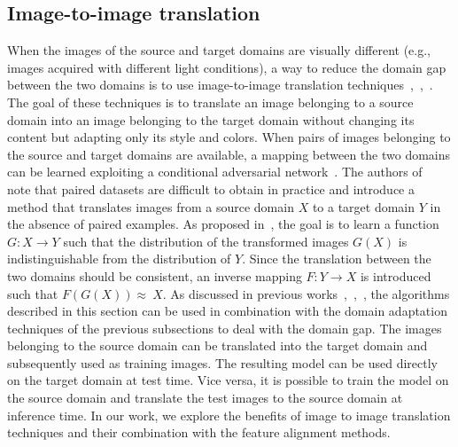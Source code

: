 \documentclass[preprint]{elsarticle}
\begin{document}
\subsection{Image-to-image translation}
When the images of the source and target domains are visually different (e.g., images acquired with different light conditions), a way to reduce the domain gap between the two domains is to use image-to-image translation techniques~\cite{Anoosheh_2019},~\cite{Murez_2018},~\cite{gonzalezgarcia2018imagetoimage}. The goal of these techniques is to translate an image belonging to a source domain into an image belonging to the target domain without changing its content but adapting only its style and colors. When pairs of images belonging to the source and target domains are available, a mapping between the two domains can be learned exploiting a conditional adversarial network~\cite{Isola_2017}. The authors of~\cite{CycleGAN2017} note that paired datasets are difficult to obtain in practice and introduce a method that translates images from a source domain $X$ to a target domain $Y$ in the absence of paired examples. As proposed in~\cite{CycleGAN2017}, the goal is to learn a function $G:X \longrightarrow Y$ such that the distribution of the transformed images $G \left (X \right)$  is indistinguishable from the distribution of $Y$. Since the translation between the two domains should be consistent, an inverse mapping $F:Y \longrightarrow X$ is introduced such that $F(G(X))\approx\ X$.
\newline
As discussed in previous works~\cite{hoffman2017cycada},~\cite{Saito_2019},~\cite{kim2019diversify}, the algorithms described in this section can be used in combination with the domain adaptation techniques of the previous subsections to deal with the domain gap. The images belonging to the source domain can be translated into the target domain and subsequently used as training images. The resulting model can be used directly on the target domain at test time. Vice versa, it is possible to train the model on the source domain and translate the test images to the source domain at inference time.
\newline
In our work, we explore the benefits of image to image translation techniques and their combination with the feature alignment methods.
\end{document}
